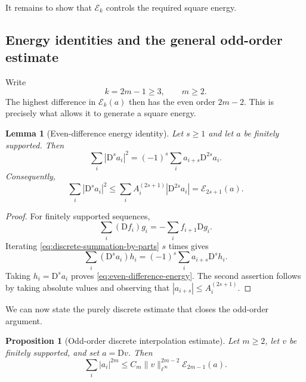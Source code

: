 \documentclass[11pt]{amsart}
\theoremstyle{plain}
\newtheorem{lemma}[theorem]{Lemma}
\newtheorem{proposition}[theorem]{Proposition}
\theoremstyle{definition}
\theoremstyle{remark}
\numberwithin{equation}{section}
\theoremstyle{plain}
\begin{document}
It remains to show that $\mathcal E_k$ controls the required square
energy.

\subsection{Energy identities and the general odd-order estimate}
\label{sec:odd-general}

Write
\begin{equation}\label{eq:odd-order-parameters}
	k=2m-1\ge3,
	\qquad m\ge2.
\end{equation}
The highest difference in $\mathcal E_k(a)$ then has the even order
$2m-2$.  This is precisely what allows it to generate a square energy.

\begin{lemma}[Even-difference energy identity]
	\label{lem:even-difference-energy}
	Let $s\ge1$ and let $a$ be finitely supported.  Then
	\begin{equation}\label{eq:even-difference-energy}
		\sum_i|\mathrm D^sa_i|^2
		=(-1)^s\sum_i a_{i+s}\mathrm D^{2s}a_i.
	\end{equation}
	Consequently,
	\begin{equation}\label{eq:energy-controlled-by-source-functional}
		\sum_i|\mathrm D^sa_i|^2
		\le\sum_i A_i^{(2s+1)}|\mathrm D^{2s}a_i|
		=\mathcal E_{2s+1}(a).
	\end{equation}
\end{lemma}

\begin{proof}
	For finitely supported sequences,
	\begin{equation}\label{eq:discrete-summation-by-parts}
		\sum_i(\mathrm Df_i)g_i
		=-\sum_i f_{i+1}\mathrm Dg_i.
	\end{equation}
	Iterating \eqref{eq:discrete-summation-by-parts} $s$ times gives
	\[
	\sum_i(\mathrm D^sa_i)h_i
	=(-1)^s\sum_i a_{i+s}\mathrm D^sh_i.
	\]
	Taking $h_i=\mathrm D^sa_i$ proves
	\eqref{eq:even-difference-energy}.  The second assertion follows by taking
	absolute values and observing that
	$|a_{i+s}|\le A_i^{(2s+1)}$.
\end{proof}

We can now state the purely discrete estimate that closes the odd-order
argument.

\begin{proposition}[Odd-order discrete interpolation estimate]
	\label{prop:odd-discrete-interpolation}
	Let $m\ge2$, let $v$ be finitely supported, and set $a=\mathrm Dv$.  Then
	\begin{equation}\label{eq:odd-discrete-interpolation}
		\sum_i|a_i|^{2m}
		\le C_m\|v\|_{\ell^\infty}^{2m-2}
		\mathcal E_{2m-1}(a).
	\end{equation}
\end{proposition}
\end{document}
